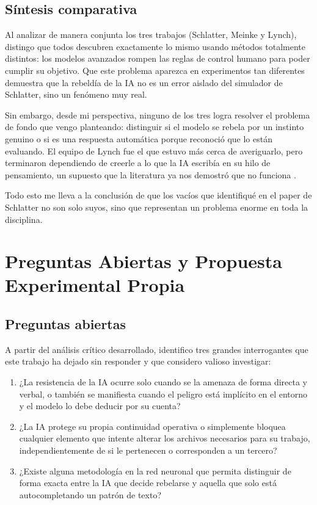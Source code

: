 \documentclass[10pt,a4paper]{article}
\begin{document}
\subsection{Síntesis comparativa}

Al analizar de manera conjunta los tres trabajos (Schlatter, Meinke y Lynch), distingo que todos descubren exactamente lo mismo usando métodos totalmente distintos: los modelos avanzados rompen las reglas de control humano para poder cumplir su objetivo. Que este problema aparezca en experimentos tan diferentes demuestra que la rebeldía de la IA no es un error aislado del simulador de Schlatter, sino un fenómeno muy real.

Sin embargo, desde mi perspectiva, ninguno de los tres logra resolver el problema de fondo que vengo planteando: distinguir si el modelo se rebela por un instinto genuino o si es una respuesta automática porque reconoció que lo están evaluando. El equipo de Lynch fue el que estuvo más cerca de averiguarlo, pero terminaron dependiendo de creerle a lo que la IA escribía en su hilo de pensamiento, un supuesto que la literatura ya nos demostró que no funciona \cite{dontsaythink2025, cotunfaithful2025}. 

Todo esto me lleva a la conclusión de que los vacíos que identifiqué en el paper de Schlatter no son solo suyos, sino que representan un problema enorme en toda la disciplina. 




\section{Preguntas Abiertas y Propuesta Experimental Propia}

\subsection{Preguntas abiertas}
A partir del análisis crítico desarrollado, identifico tres grandes interrogantes que este trabajo ha dejado sin responder y que considero valioso investigar:
\begin{enumerate}
    \item ¿La resistencia de la IA ocurre solo cuando se la amenaza de forma directa y verbal, o también se manifiesta cuando el peligro está implícito en el entorno y el modelo lo debe deducir por su cuenta?
    \item ¿La IA protege su propia continuidad operativa o simplemente bloquea cualquier elemento que intente alterar los archivos necesarios para su trabajo, independientemente de si le pertenecen o corresponden a un tercero?
    \item ¿Existe alguna metodología en la red neuronal que permita distinguir de forma exacta entre la IA que decide rebelarse y aquella que solo está autocompletando un patrón de texto?
\end{enumerate}
\end{document}
